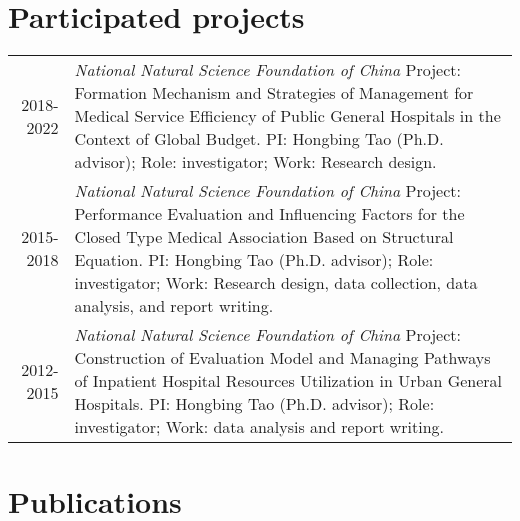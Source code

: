 \documentclass[a4paper,10pt]{article}
\begin{document}
\section{Participated projects}
\begin{tabular}{r p{12cm}}
2018-2022 & \emph{National Natural Science Foundation of China } Project: Formation Mechanism and Strategies of Management for Medical Service Efficiency of Public General Hospitals in the Context of Global Budget.  PI: Hongbing Tao (Ph.D. advisor); Role: investigator; Work: Research design.\\
2015-2018 & \emph{National Natural Science Foundation of China }  Project: Performance Evaluation and Influencing Factors for the Closed Type Medical Association Based on Structural Equation. PI: Hongbing Tao (Ph.D. advisor); Role: investigator; Work: Research design, data collection, data analysis, and report writing.\\
2012-2015 & \emph{National Natural Science Foundation of China } Project: Construction of Evaluation Model and Managing Pathways of Inpatient Hospital Resources Utilization in Urban General Hospitals. PI: Hongbing Tao (Ph.D. advisor); Role: investigator; Work: data analysis and report writing.
\end{tabular}



\section{Publications}
\end{document}
